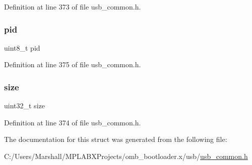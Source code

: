 Definition at line 373 of file usb\+\_\+common.\+h.

\mbox{\label{struct__transfer__event__data_a108af4844b813f4ea332bab4e84aa87e}} 
\subsubsection{\texorpdfstring{pid}{pid}}
{\footnotesize\ttfamily uint8\+\_\+t pid}



Definition at line 375 of file usb\+\_\+common.\+h.

\mbox{\label{struct__transfer__event__data_ab2c6b258f02add8fdf4cfc7c371dd772}} 
\subsubsection{\texorpdfstring{size}{size}}
{\footnotesize\ttfamily uint32\+\_\+t size}



Definition at line 374 of file usb\+\_\+common.\+h.



The documentation for this struct was generated from the following file\+:\begin{DoxyCompactItemize}
\item 
C\+:/\+Users/\+Marshall/\+M\+P\+L\+A\+B\+X\+Projects/omb\+\_\+bootloader.\+x/usb/\mbox{\hyperlink{usb__common_8h}{usb\+\_\+common.\+h}}\end{DoxyCompactItemize}
